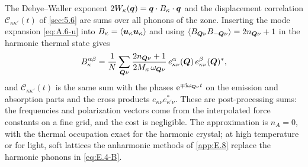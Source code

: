 The Debye--Waller exponent $2W_\kappa(\bm{q}) = \bm{q}\cdot B_\kappa\cdot\bm{q}$ and the displacement correlation $\mathcal{C}_{\kappa\kappa'}(t)$ of \cref{sec:5.6} are sums over all phonons of the zone. Inserting the mode expansion \cref{eq:A.6-u} into $B_\kappa = \langle\bm{u}_\kappa\bm{u}_\kappa\rangle$ and using $\langle B_{\bm{Q}\nu}B_{-\bm{Q}\nu}\rangle = 2n_{\bm{Q}\nu} + 1$ in the harmonic thermal state gives
\begin{equation}
  B^{\alpha\beta}_\kappa = \frac{1}{N}\sum_{\bm{Q}\nu}\frac{2n_{\bm{Q}\nu} + 1}{2M_\kappa\,\omega_{\bm{Q}\nu}}\,
  e^\alpha_{\kappa\nu}(\bm{Q})\,e^{\beta}_{\kappa\nu}(\bm{Q})^* ,
  \label{eq:E.4-B}
\end{equation}
and $\mathcal{C}_{\kappa\kappa'}(t)$ is the same sum with the phases $\mathrm{e}^{\mp\mathrm{i}\omega_{\bm{Q}\nu}t}$ on the emission and absorption parts and the cross products $e_{\kappa\nu}e^*_{\kappa'\nu}$. These are post-processing sums: the frequencies and polarization vectors come from the interpolated force constants on a fine grid, and the cost is negligible. The approximation is $n_A = 0$, with the thermal occupation exact for the harmonic crystal; at high temperature or for light, soft lattices the anharmonic methods of \cref{app:E.8} replace the harmonic phonons in \cref{eq:E.4-B}.

